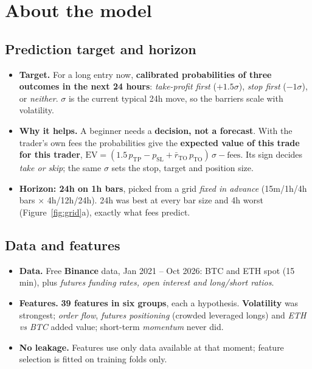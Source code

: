 \documentclass[10pt,a4paper]{article}
\begin{document}
\section{About the model}

\subsection{Prediction target and horizon}
\begin{itemize}
  \item \textbf{Target.} For a long entry now, \textbf{calibrated probabilities of three outcomes in the next 24 hours}:
        \emph{take-profit first} ($+1.5\sigma$), \emph{stop first} ($-1\sigma$), or \emph{neither}. $\sigma$ is the current
        typical 24h move, so the barriers scale with volatility.
  \item \textbf{Why it helps.} A beginner needs a \textbf{decision, not a forecast}. With the trader's own fees the probabilities give
        the \textbf{expected value of this trade for this trader},
        $\mathrm{EV} = (1.5\,p_{\mathrm{TP}} - p_{\mathrm{SL}} + \bar r_{\mathrm{TO}}\,p_{\mathrm{TO}})\,\sigma - \text{fees}$.
        Its sign decides \emph{take or skip}; the same $\sigma$ sets the stop, target and position size.
  \item \textbf{Horizon: 24h on 1h bars}, picked from a grid \emph{fixed in advance} (15m/1h/4h bars $\times$ 4h/12h/24h).
        24h was best at every bar size and 4h worst (Figure~\ref{fig:grid}a), exactly what fees predict.
\end{itemize}

\subsection{Data and features}
\begin{itemize}
  \item \textbf{Data.} Free \textbf{Binance} data, Jan 2021 -- Oct 2026: BTC and ETH spot (15 min), plus \emph{futures funding rates,
        open interest and long/short ratios}.
  \item \textbf{Features.} \textbf{39 features in six groups}, each a hypothesis. \textbf{Volatility} was strongest; \emph{order flow},
        \emph{futures positioning} (crowded leveraged longs) and \emph{ETH vs BTC} added value; short-term \emph{momentum} never did.
  \item \textbf{No leakage.} Features use only data available at that moment; feature selection is fitted on training folds only.
\end{itemize}
\end{document}

